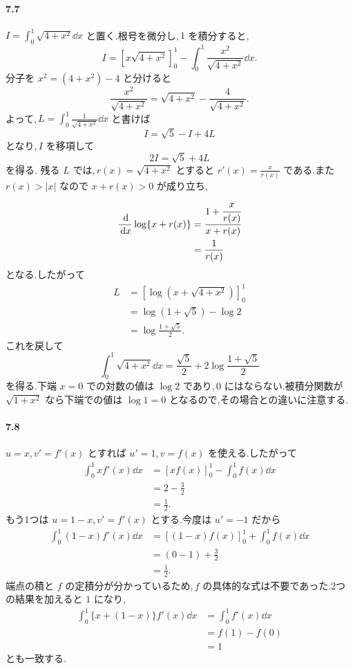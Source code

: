 \paragraph{7.7}
$I=\int_0^1\sqrt{4+x^2}\dd x$ と置く.根号を微分し,\,$1$ を積分すると,
\[
 I=[x\sqrt{4+x^2}]_0^1
   -\int_0^1\frac{x^2}{\sqrt{4+x^2}}\dd x.
\]
分子を $x^2=(4+x^2)-4$ と分けると
\[
 \frac{x^2}{\sqrt{4+x^2}}
 =\sqrt{4+x^2}-\frac4{\sqrt{4+x^2}}.
\]
よって,\,$L=\int_0^1\frac1{\sqrt{4+x^2}}\dd x$ と書けば
\[
 I=\sqrt5-I+4L
\]
となり,\,$I$ を移項して
\[
 2I=\sqrt5+4L
\]
を得る.
残る $L$ では,\,$r(x)=\sqrt{4+x^2}$ とすると $r'(x)=\frac{x}{r(x)}$ である.また $r(x)>|x|$ なので $x+r(x)>0$ が成り立ち,
\[
\begin{aligned}
 \frac{\,\mathrm{d}}{\,\mathrm{d} x}\log\{x+r(x)\}
 &=\cfrac{1+\cfrac{x}{r(x)}}{x+r(x)}\\
 &=\frac1{r(x)}
\end{aligned}
\]
となる.したがって
\[
\begin{aligned}
 L&=[\log(x+\sqrt{4+x^2})]_0^1\\
  &=\log(1+\sqrt5)-\log2\\
  &=\log\frac{1+\sqrt5}{2}.
\end{aligned}
\]
これを戻して
\[
 \boxed{\int_0^1\sqrt{4+x^2}\dd x
 =\frac{\sqrt5}{2}+2\log\frac{1+\sqrt5}{2}}
\]
を得る.下端 $x=0$ での対数の値は $\log2$ であり,\,$0$ にはならない.被積分関数が $\sqrt{1+x^2}$ なら下端での値は $\log1=0$ となるので,その場合との違いに注意する.

\paragraph{7.8}
$u=x$,\,$v'=f'(x)$ とすれば $u'=1$,\,$v=f(x)$ を使える.したがって
\[
\begin{aligned}
 \int_0^1xf'(x)\dd x
 &=[xf(x)]_0^1-\int_0^1f(x)\dd x\\
 &=2-\frac32\\
 &=\frac12.
\end{aligned}
\]
もう1つは $u=1-x$,\,$v'=f'(x)$ とする.今度は $u'=-1$ だから
\[
\begin{aligned}
 \int_0^1(1-x)f'(x)\dd x
 &=[(1-x)f(x)]_0^1+\int_0^1f(x)\dd x\\
 &=(0-1)+\frac32\\
 &=\frac12.
\end{aligned}
\]
端点の積と $f$ の定積分が分かっているため,\,$f$ の具体的な式は不要であった.2つの結果を加えると $1$ になり,
\[
\begin{aligned}
 \int_0^1\{x+(1-x)\}f'(x)\dd x
 &=\int_0^1f'(x)\dd x\\
 &=f(1)-f(0)\\
 &=1
\end{aligned}
\]
とも一致する.
